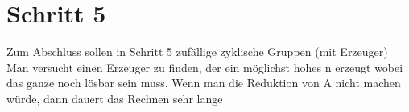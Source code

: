 \section{Schritt 5}
Zum Abschluss sollen in Schritt 5 zufällige zyklische Gruppen (mit Erzeuger)
Man versucht einen Erzeuger zu finden, der ein möglichst hohes n erzeugt wobei das ganze noch lösbar sein muss. Wenn man die Reduktion von A nicht machen würde, dann dauert das Rechnen sehr lange